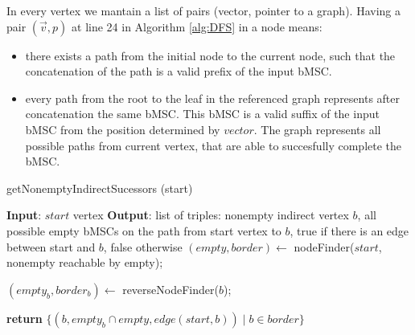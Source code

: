 \documentclass{article}
\begin{document}
In every vertex we mantain a list of pairs (vector, pointer to a graph). Having a pair  $(\vec{v},p)$ at line 24 in Algorithm \ref{alg:DFS} in a node means:
\begin{itemize}
\item there exists a path from the initial node to the current node, such that the concatenation of the path is a valid prefix of the input bMSC.
\item every path from the root to the leaf in the referenced graph represents after concatenation the same bMSC. This bMSC is a valid suffix of the input bMSC from the position determined by $vector$. The graph represents all possible paths from current vertex, that are able to succesfully complete the bMSC.
\end{itemize}

\begin{algorithm}
\caption{getNonemptyIndirectSucessors (start)}
\begin{algorithmic}[1]
\STATE \textbf{Input}: $start$ vertex
\STATE \textbf{Output}: list of triples: nonempty indirect vertex $b$, all possible empty bMSCs on the path from start vertex to $b$, true if there is an edge between start and $b$, false otherwise
\STATE
\STATE $(empty, border) \leftarrow$ nodeFinder($start$, nonempty reachable by empty);

\STATE $(empty_{b},border_{b}) \leftarrow$ reverseNodeFinder($b$);
\ENDFOR

\STATE \textbf{return} $\{(b,empty_{b} \cap empty, edge(start,b)) \mid b \in border \}$
\end{algorithmic}
\end{algorithm}
\begin{comment}
\begin{algorithm}
\caption{updateDAG(vertex,vector,new\_vector,list)}
\begin{algorithmic}[1]
\IF{$\exists$ u: (u,v,t) $\in$ list: u.attributes.getDAG (new\_vector)   $\not =$ NULL}
 \STATE *p $\leftarrow$ new node (p.name $\leftarrow$ vertex);
 \FORALL{$u \mid (u,v,t) \in$ list}
 \IF{$v \mid (u,v,t) = \emptyset$}
 \STATE p.next.add(u.attributes.getDAG(new\_vector));
 \ELSE
 \STATE *q $\leftarrow$ new node (q.name $\leftarrow$ v);
 \STATE q.next.add(u.attributes.getDAG(new\_vector));
 \STATE p.next.add(q);
 \IF{$t \mid (u,v,t)$}
 \STATE p.next.add(u.attributes.getDAG(new\_vector));
 \ENDIF
 \ENDIF
 \ENDFOR

\ENDIF

\end{algorithmic}
\end{algorithm}
\end{comment}
\end{document}
